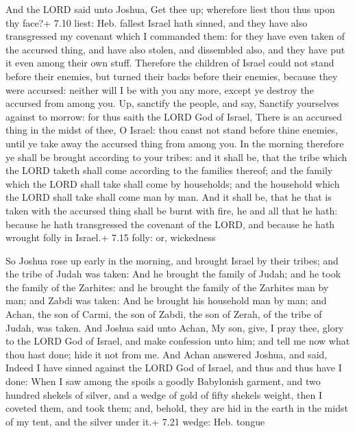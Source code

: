  And the LORD said unto Joshua, Get thee up; wherefore
liest thou thus upon thy face?+ 7.10 liest: Heb. fallest 
Israel hath sinned, and they have also transgressed my covenant which I
commanded them: for they have even taken of the accursed thing, and have
also stolen, and dissembled also, and they have put it even among their
own stuff.  Therefore the children of Israel could not
stand before their enemies, but turned their backs before their enemies,
because they were accursed: neither will I be with you any more, except
ye destroy the accursed from among you.  Up, sanctify the
people, and say, Sanctify yourselves against to morrow: for thus saith
the LORD God of Israel, There is an accursed thing in the midst of thee,
O Israel: thou canst not stand before thine enemies, until ye take away
the accursed thing from among you.  In the morning
therefore ye shall be brought according to your tribes: and it shall be,
that the tribe which the LORD taketh shall come according to the
families thereof; and the family which the LORD shall take shall come by
households; and the household which the LORD shall take shall come man
by man.  And it shall be, that he that is taken with the
accursed thing shall be burnt with fire, he and all that he hath:
because he hath transgressed the covenant of the LORD, and because he
hath wrought folly in Israel.+ 7.15 folly: or, wickedness

 So Joshua rose up early in the morning, and brought
Israel by their tribes; and the tribe of Judah was taken: 
And he brought the family of Judah; and he took the family of the
Zarhites: and he brought the family of the Zarhites man by man; and
Zabdi was taken:  And he brought his household man by man;
and Achan, the son of Carmi, the son of Zabdi, the son of Zerah, of the
tribe of Judah, was taken.  And Joshua said unto Achan, My
son, give, I pray thee, glory to the LORD God of Israel, and make
confession unto him; and tell me now what thou hast done; hide it not
from me.  And Achan answered Joshua, and said, Indeed I
have sinned against the LORD God of Israel, and thus and thus have I
done:  When I saw among the spoils a goodly Babylonish
garment, and two hundred shekels of silver, and a wedge of gold of fifty
shekels weight, then I coveted them, and took them; and, behold, they
are hid in the earth in the midst of my tent, and the silver under it.+
7.21 wedge: Heb. tongue

